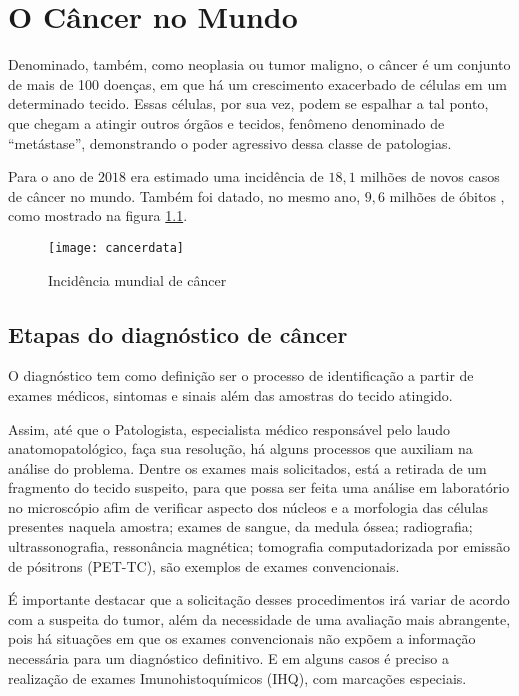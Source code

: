 \chapter{O Câncer no Mundo}
\label{chapter:o_cancer_no_mundo}

Denominado, também, como neoplasia ou tumor maligno, o câncer é um conjunto de
mais de 100 doenças, em que há um crescimento exacerbado de células em um
determinado tecido. Essas células, por sua vez, podem se espalhar a tal ponto,
que chegam a atingir outros órgãos e tecidos, fenômeno denominado de
“metástase”, demonstrando o poder agressivo dessa classe de patologias.\cite{OQUEECANCER}

Para o ano de $2018$ era estimado uma incidência de $18,1$ milhões de novos casos de câncer no mundo.
Também foi datado, no mesmo ano, $9,6$ milhões de óbitos \cite{MOC}, como mostrado na figura \ref{fig:cancerdata}.

\begin{figure}[H]
\begin{center}
\caption{Incidência mundial de câncer}
\texttt{[image: cancerdata]}
\label{fig:cancerdata}
\end{center}
\end{figure}

\section{\textbf{Etapas do diagnóstico de câncer}}

O diagnóstico tem como definição ser o processo de identificação a partir de
exames médicos, sintomas e sinais além das amostras do tecido atingido.\cite{ATLAS}

Assim, até que o Patologista, especialista médico responsável pelo laudo anatomopatológico,
faça sua resolução, há alguns processos que auxiliam na análise do problema.
Dentre os exames mais solicitados, está a retirada de um fragmento do tecido suspeito,
para que possa ser feita uma análise em laboratório no microscópio afim de verificar aspecto dos núcleos e
a morfologia das células presentes naquela amostra;
exames de sangue, da medula óssea; radiografia; ultrassonografia, ressonância magnética;
tomografia computadorizada por emissão de pósitrons (PET-TC), são exemplos de exames convencionais.\cite{VENCER}

É importante destacar que a solicitação desses procedimentos irá variar de acordo com a suspeita do tumor,
além da necessidade de uma avaliação mais abrangente,
pois há situações em que os exames convencionais não expõem a informação necessária para um diagnóstico definitivo.
E em alguns casos é preciso a realização de exames Imunohistoquímicos (IHQ), com marcações especiais.

